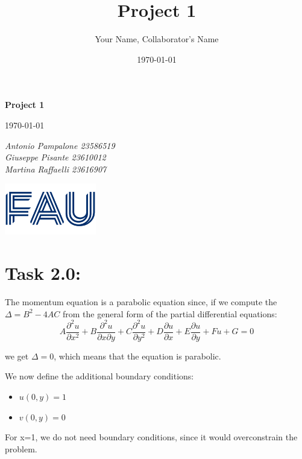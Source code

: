 \documentclass{article}
\title{Project 1}
\author{Your Name, Collaborator's Name}
\date{\today}
\begin{document}
\begin{titlepage}
    \centering
    \vspace*{1in}
    
    {\Huge\bfseries Project 1\par}
    \vspace{1.5cm}
    {\Large \today\par}
    \vspace{1.5cm}
    {\Large\itshape Antonio Pampalone 23586519 \\ Giuseppe Pisante 23610012\\ Martina Raffaelli 23616907 \par}
    
    \vfill
    \includegraphics[width=0.3\textwidth]{FAU-Logo.png}\par\vspace{1cm} %
   
\end{titlepage}

\newpage
\small

\section*{\Large Task 2.0:}
The momentum equation is a parabolic equation since, if we compute the $\Delta = B^2 - 4AC$ from the general form of the partial differential equations: 
\[
\]
\begin{equation}
  A \frac{\partial^2 u}{\partial x^2} + B \frac{\partial^2 u}{\partial x \partial y} + C \frac{\partial^2 u}{\partial y^2} + D \frac{\partial u}{\partial x} + E \frac{\partial u}{\partial y} + F u + G = 0
\end{equation}

we get $\Delta = 0$, which means that the equation is parabolic.

We now define the additional boundary conditions:
\begin{itemize}
  \item $u(0,y) = 1$
  \item $v(0,y) = 0$
\end{itemize}

For x=1, we do not need boundary conditions, since it would overconstrain the problem.
\end{document}
